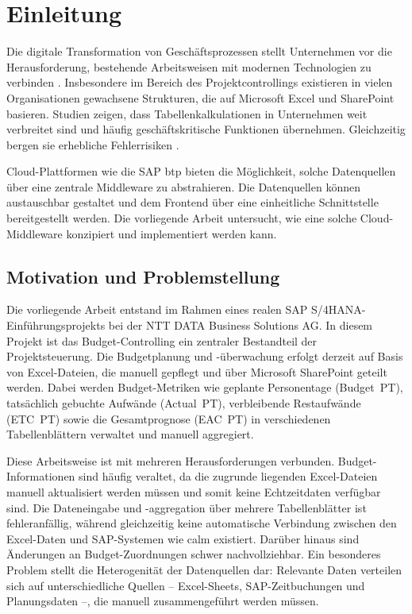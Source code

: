 \section{Einleitung}

Die digitale Transformation von Geschäftsprozessen stellt Unternehmen vor die Herausforderung, bestehende Arbeitsweisen mit modernen Technologien zu verbinden \citep{westerman2014}. Insbesondere im Bereich des Projektcontrollings existieren in vielen Organisationen gewachsene Strukturen, die auf Microsoft Excel und SharePoint basieren. Studien zeigen, dass Tabellenkalkulationen in Unternehmen weit verbreitet sind und häufig geschäftskritische Funktionen übernehmen. Gleichzeitig bergen sie erhebliche Fehlerrisiken \citep{panko2016, powell2009}.

Cloud-Plattformen wie die SAP \gls{btp} bieten die Möglichkeit, solche Datenquellen über eine zentrale Middleware zu abstrahieren. Die Datenquellen können austauschbar gestaltet und dem Frontend über eine einheitliche Schnittstelle bereitgestellt werden. Die vorliegende Arbeit untersucht, wie eine solche Cloud-Middleware konzipiert und implementiert werden kann.

\subsection{Motivation und Problemstellung}

Die vorliegende Arbeit entstand im Rahmen eines realen SAP S/4HANA-Einführungsprojekts bei der NTT DATA Business Solutions AG. In diesem Projekt ist das Budget-Controlling ein zentraler Bestandteil der Projektsteuerung. Die Budgetplanung und -überwachung erfolgt derzeit auf Basis von Excel-Dateien, die manuell gepflegt und über Microsoft SharePoint geteilt werden. Dabei werden Budget-Metriken wie geplante Personentage (Budget~PT), tatsächlich gebuchte Aufwände (Actual~PT), verbleibende Restaufwände (ETC~PT) sowie die Gesamtprognose (EAC~PT) in verschiedenen Tabellenblättern verwaltet und manuell aggregiert.

Diese Arbeitsweise ist mit mehreren Herausforderungen verbunden. Budget-Informationen sind häufig veraltet, da die zugrunde liegenden Excel-Dateien manuell aktualisiert werden müssen und somit keine Echtzeitdaten verfügbar sind. Die Dateneingabe und -aggregation über mehrere Tabellenblätter ist fehleranfällig, während gleichzeitig keine automatische Verbindung zwischen den Excel-Daten und SAP-Systemen wie \gls{calm} existiert. Darüber hinaus sind Änderungen an Budget-Zuordnungen schwer nachvollziehbar. Ein besonderes Problem stellt die Heterogenität der Datenquellen dar: Relevante Daten verteilen sich auf unterschiedliche Quellen -- Excel-Sheets, SAP-Zeitbuchungen und Planungsdaten --, die manuell zusammengeführt werden müssen.

